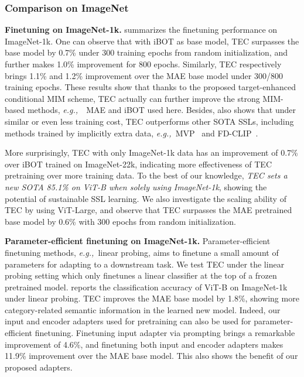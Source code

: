 \documentclass{article} \usepackage{iclr2023_conference,times}
\newcommand{\myPara}[1]{\vspace{-.05in} \noindent\textbf{#1}}
\def\eg{\emph{e.g.,~}}
\begin{document}
\subsubsection{Comparison on  ImageNet }
\vspace{-5pt}
\myPara{Finetuning on ImageNet-1k.}  summarizes the   finetuning performance on ImageNet-1k. 
One can observe  that with iBOT as base model, TEC surpasses the base model by 0.7\% under   300 training epochs from random initialization, and further makes  1.0\% improvement for 800 epochs.  
Similarly, TEC respectively brings 1.1\% and 1.2\% improvement over the MAE base model under  300/800 training epochs. 
These results show that  thanks to the proposed target-enhanced conditional MIM scheme, TEC actually can further improve the strong MIM-based methods, \eg~MAE and iBOT used here. Besides,   also shows that under similar or even less training cost,  TEC outperforms other SOTA SSLs, including methods trained by implicitly extra data, \eg MVP~\citep{wei2022mvp} and FD-CLIP~\citep{wei2022contrastive}.  

More surprisingly,  TEC with only ImageNet-1k data has an improvement of 0.7\% over iBOT trained on  ImageNet-22k, indicating more effectiveness of TEC pretraining over more training data.   
To the best of our knowledge, \textit{TEC sets a new SOTA 85.1\% on ViT-B when solely using ImageNet-1k}, showing the potential of sustainable SSL learning. 
We also investigate the scaling ability of TEC by using ViT-Large, and observe that TEC surpasses the MAE pretrained base model by 0.6\% with 300 epochs from random initialization.


\myPara{Parameter-efficient finetuning on ImageNet-1k.}
Parameter-efficient finetuning methods, \eg linear probing, aims to  finetune a small amount  of parameters for adapting to a downstream task. 
We test TEC under the linear probing setting which  only finetunes a linear classifier at the top of a frozen pretrained model.  reports the classification accuracy  of  ViT-B on ImageNet-1k under linear probing.  TEC improves the MAE base model by 1.8\%, showing more category-related semantic information in the learned new model. 
Indeed, our input and encoder adapters used for pretraining can also be used for parameter-efficient finetuning. 
Finetuning input adapter via prompting  brings a remarkable improvement  of 4.6\%, and finetuning both  input and encoder adapters makes  11.9\% improvement over the MAE base model. This also shows the benefit of our proposed adapters. 
\end{document}

